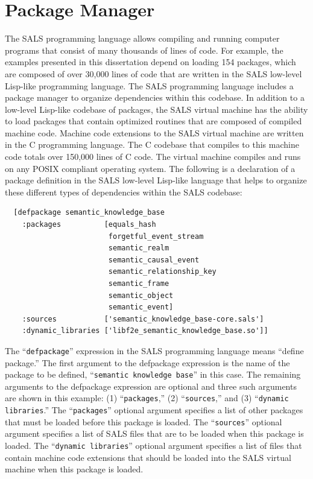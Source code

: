 \section{Package Manager}

The SALS programming language allows compiling and running computer
programs that consist of many thousands of lines of code.  For
example, the examples presented in this dissertation depend on loading
154 packages, which are composed of over 30,000 lines of code that are
written in the SALS low-level Lisp-like programming language.  The
SALS programming language includes a package manager to organize
dependencies within this codebase.  In addition to a low-level
Lisp-like codebase of packages, the SALS virtual machine has the
ability to load packages that contain optimized routines that are
composed of compiled machine code.  Machine code extensions to the
SALS virtual machine are written in the C programming language.  The C
codebase that compiles to this machine code totals over 150,000 lines
of C code.  The virtual machine compiles and runs on any POSIX
compliant operating system.  The following is a declaration of a
package definition in the SALS low-level Lisp-like language that helps
to organize these different types of dependencies within the SALS
codebase:
\begin{samepage}
\begin{Verbatim}
  [defpackage semantic_knowledge_base
    :packages          [equals_hash
                        forgetful_event_stream
                        semantic_realm
                        semantic_causal_event
                        semantic_relationship_key
                        semantic_frame
                        semantic_object
                        semantic_event]
    :sources           ['semantic_knowledge_base-core.sals']
    :dynamic_libraries ['libf2e_semantic_knowledge_base.so']]
\end{Verbatim}
\end{samepage}
The ``{\tt{defpackage}}'' expression in the SALS programming language
means ``define package.''  The first argument to the defpackage
expression is the name of the package to be defined, ``{\tt{semantic
    knowledge base}}'' in this case.  The remaining arguments to the
defpackage expression are optional and three such arguments are shown
in this example: (1) ``{\tt{packages}},'' (2) ``{\tt{sources}},'' and
(3) ``{\tt{dynamic libraries}}.''  The ``{\tt{packages}}'' optional
argument specifies a list of other packages that must be loaded before
this package is loaded.  The ``{\tt{sources}}'' optional argument
specifies a list of SALS files that are to be loaded when this package
is loaded.  The ``{\tt{dynamic libraries}}'' optional argument
specifies a list of files that contain machine code extensions that
should be loaded into the SALS virtual machine when this package is
loaded.


